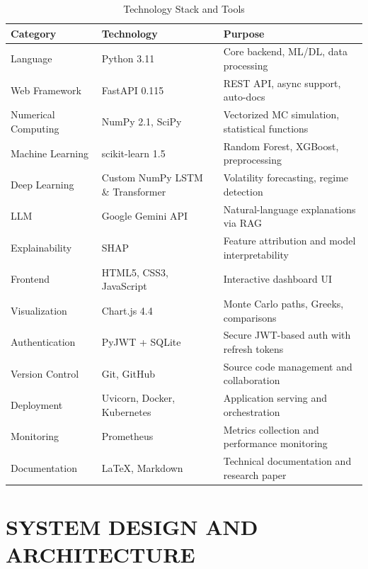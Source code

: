 \documentclass[12pt,a4paper]{report}
\begin{document}
\begin{table}[H]
\centering
\caption{Technology Stack and Tools}
\label{tab:tech-stack}
\begin{tabularx}{\textwidth}{|l|l|X|}
\hline
\textbf{Category} & \textbf{Technology} & \textbf{Purpose} \\
\hline
Language & Python 3.11 & Core backend, ML/DL, data processing \\
\hline
Web Framework & FastAPI 0.115 & REST API, async support, auto-docs \\
\hline
Numerical Computing & NumPy 2.1, SciPy & Vectorized MC simulation, statistical functions \\
\hline
Machine Learning & scikit-learn 1.5 & Random Forest, XGBoost, preprocessing \\
\hline
Deep Learning & Custom NumPy LSTM \& Transformer & Volatility forecasting, regime detection \\
\hline
LLM & Google Gemini API & Natural-language explanations via RAG \\
\hline
Explainability & SHAP & Feature attribution and model interpretability \\
\hline
Frontend & HTML5, CSS3, JavaScript & Interactive dashboard UI \\
\hline
Visualization & Chart.js 4.4 & Monte Carlo paths, Greeks, comparisons \\
\hline
Authentication & PyJWT + SQLite & Secure JWT-based auth with refresh tokens \\
\hline
Version Control & Git, GitHub & Source code management and collaboration \\
\hline
Deployment & Uvicorn, Docker, Kubernetes & Application serving and orchestration \\
\hline
Monitoring & Prometheus & Metrics collection and performance monitoring \\
\hline
Documentation & LaTeX, Markdown & Technical documentation and research paper \\
\hline
\end{tabularx}
\end{table}



\chapter{SYSTEM DESIGN AND ARCHITECTURE}
\end{document}

